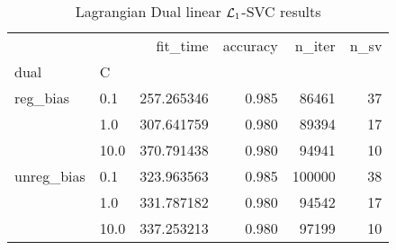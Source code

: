 \begin{table}[H]
\centering
\caption{Lagrangian Dual linear $\protect \mathcal{L}_1$-SVC results}
\label{linear_lagrangian_dual_l1_svc_cv_results}
\begin{tabular}{llrrrr}
\toprule
           &      &    fit\_time &  accuracy &  n\_iter &  n\_sv \\
dual & C &             &           &         &       \\
\midrule
reg\_bias & 0.1  &  257.265346 &     0.985 &   86461 &    37 \\
           & 1.0  &  307.641759 &     0.980 &   89394 &    17 \\
           & 10.0 &  370.791438 &     0.980 &   94941 &    10 \\
unreg\_bias & 0.1  &  323.963563 &     0.985 &  100000 &    38 \\
           & 1.0  &  331.787182 &     0.980 &   94542 &    17 \\
           & 10.0 &  337.253213 &     0.980 &   97199 &    10 \\
\bottomrule
\end{tabular}
\end{table}
